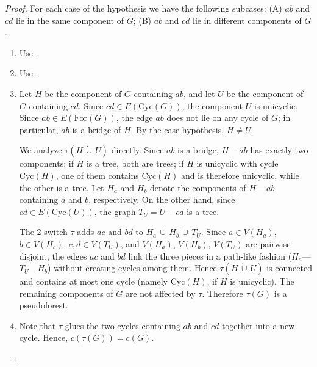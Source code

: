 \documentclass[10pt,a4paper]{amsart}
\begin{document}
\begin{proof}
	For each case of the hypothesis we have the following subcases:
	(A) $ab$ and $cd$ lie in the same component of $G$;
	(B) $ab$ and $cd$ lie in different components of $G$.
	\begin{enumerate}
		\item[(1.A)] Use .

		\item[(2.A)] Use .

		\item[(1.B)] Let $H$ be the component of $G$ containing $ab$, and let $U$ be the component of $G$ containing $cd$. Since $cd \in E(\mathrm{Cyc}(G))$, the component $U$ is unicyclic. Since $ab \in E(\mathrm{For}(G))$, the edge $ab$ does not lie on any cycle of $G$; in particular, $ab$ is a bridge of $H$. By the case hypothesis, $H \ne U$.

		We analyze $\tau(H \,\dot\cup\, U)$ directly. Since $ab$ is a bridge, $H - ab$ has exactly two components: if $H$ is a tree, both are trees; if $H$ is unicyclic with cycle $\mathrm{Cyc}(H)$, one of them contains $\mathrm{Cyc}(H)$ and is therefore unicyclic, while the other is a tree. Let $H_a$ and $H_b$ denote the components of $H - ab$ containing $a$ and $b$, respectively. On the other hand, since $cd \in E(\mathrm{Cyc}(U))$, the graph $T_U = U - cd$ is a tree.

		The 2-switch $\tau$ adds $ac$ and $bd$ to $H_a \,\dot\cup\, H_b \,\dot\cup\, T_U$. Since $a \in V(H_a)$, $b \in V(H_b)$, $c, d \in V(T_U)$, and $V(H_a)$, $V(H_b)$, $V(T_U)$ are pairwise disjoint, the edges $ac$ and $bd$ link the three pieces in a path-like fashion ($H_a$---$T_U$---$H_b$) without creating cycles among them. Hence $\tau(H \,\dot\cup\, U)$ is connected and contains at most one cycle (namely $\mathrm{Cyc}(H)$, if $H$ is unicyclic). The remaining components of $G$ are not affected by $\tau$. Therefore $\tau(G)$ is a pseudoforest.

		\item[(2.B)] Note that $\tau$ glues the two cycles containing $ab$ and $cd$ together into a new cycle. Hence, $c(\tau(G)) = c(G)$. \qedhere
	\end{enumerate}
\end{proof}
\end{document}
